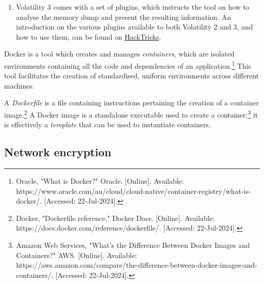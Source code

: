 \begin{myenum}
\begin{enumerate}
		\item Volatility 3 comes with a set of plugins, which instructs the tool on how to analyse the memory dump and present the resulting information. An introduction on the various plugins available to both Volatility 2 and 3, and how to use them, can be found on \href{https://book.hacktricks.xyz/generic-methodologies-and-resources/basic-forensic-methodology/memory-dump-analysis/volatility-cheatsheet}{HackTricks}.
	\end{enumerate}
	\item Docker is a tool which creates and manages \emph{containers}, which are isolated environments containing all the code and dependencies of an application.\footnote{Oracle, "What is Docker?" Oracle. [Online]. Available: https://www.oracle.com/au/cloud/cloud-native/container-registry/what-is-docker/. [Accessed: 22-Jul-2024].} This tool facilitates the creation of standardised, uniform environments across different machines.
	\item A \emph{Dockerfile} is a file containing instructions pertaining the creation of a container image.\footnote{Docker, "Dockerfile reference," Docker Docs. [Online]. Available: https://docs.docker.com/reference/dockerfile/. [Accessed: 22-Jul-2024].} A Docker image is a standalone executable used to create a container;\footnote{Amazon Web Services, "What’s the Difference Between Docker Images and Containers?" AWS. [Online]. Available: https://aws.amazon.com/compare/the-difference-between-docker-images-and-containers/. [Accessed: 22-Jul-2024].} it is effectively a \emph{template} that can be used to instantiate containers.
\end{myenum}

\subsection{Network encryption} %
\label{sub:Network encryption}

